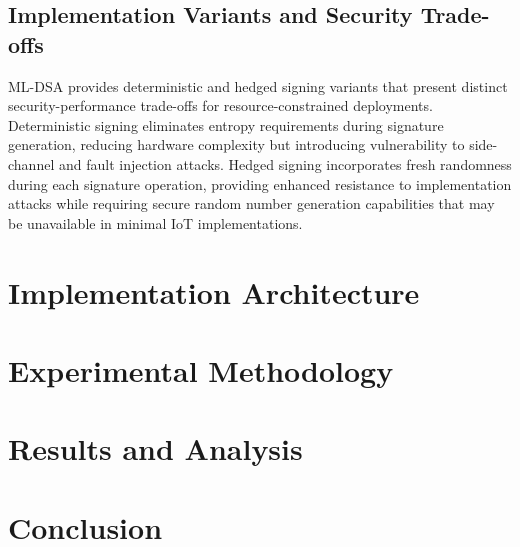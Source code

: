 \documentclass[journal=tches,final]{iacrtrans}
\begin{document}
\subsection{Implementation Variants and Security Trade-offs}

ML-DSA provides deterministic and hedged signing variants that present distinct security-performance trade-offs for resource-constrained deployments. Deterministic signing eliminates entropy requirements during signature generation, reducing hardware complexity but introducing vulnerability to side-channel and fault injection attacks. Hedged signing incorporates fresh randomness during each signature operation, providing enhanced resistance to implementation attacks while requiring secure random number generation capabilities that may be unavailable in minimal IoT implementations.

\color{black}

\section{Implementation Architecture}\label{sec:architecture}

\section{Experimental Methodology}\label{sec:methodology}

\section{Results and Analysis}\label{sec:results}

\section{Conclusion}\label{sec:conclusion}

\newpage



\end{document}
